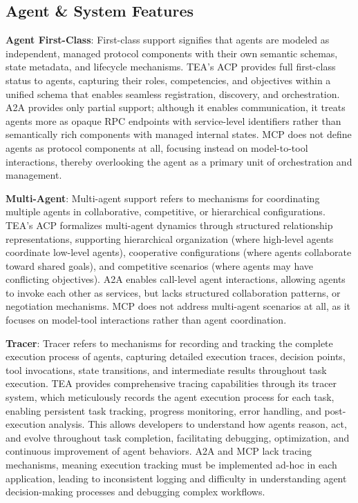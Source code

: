 \documentclass[11pt]{article}
\begin{document}
\subsection{Agent \& System Features}

\textbf{Agent First-Class}: First-class support signifies that agents are modeled as independent, managed protocol components with their own semantic schemas, state metadata, and lifecycle mechanisms. TEA's ACP provides full first-class status to agents, capturing their roles, competencies, and objectives within a unified schema that enables seamless registration, discovery, and orchestration. A2A provides only partial support; although it enables communication, it treats agents more as opaque RPC endpoints with service-level identifiers rather than semantically rich components with managed internal states. MCP does not define agents as protocol components at all, focusing instead on model-to-tool interactions, thereby overlooking the agent as a primary unit of orchestration and management.

\textbf{Multi-Agent}: Multi-agent support refers to mechanisms for coordinating multiple agents in collaborative, competitive, or hierarchical configurations. TEA's ACP formalizes multi-agent dynamics through structured relationship representations, supporting hierarchical organization (where high-level agents coordinate low-level agents), cooperative configurations (where agents collaborate toward shared goals), and competitive scenarios (where agents may have conflicting objectives). A2A enables call-level agent interactions, allowing agents to invoke each other as services, but lacks structured collaboration patterns, or negotiation mechanisms. MCP does not address multi-agent scenarios at all, as it focuses on model-tool interactions rather than agent coordination.

\textbf{Tracer}: Tracer refers to mechanisms for recording and tracking the complete execution process of agents, capturing detailed execution traces, decision points, tool invocations, state transitions, and intermediate results throughout task execution. TEA provides comprehensive tracing capabilities through its tracer system, which meticulously records the agent execution process for each task, enabling persistent task tracking, progress monitoring, error handling, and post-execution analysis. This allows developers to understand how agents reason, act, and evolve throughout task completion, facilitating debugging, optimization, and continuous improvement of agent behaviors. A2A and MCP lack tracing mechanisms, meaning execution tracking must be implemented ad-hoc in each application, leading to inconsistent logging and difficulty in understanding agent decision-making processes and debugging complex workflows.
\end{document}
